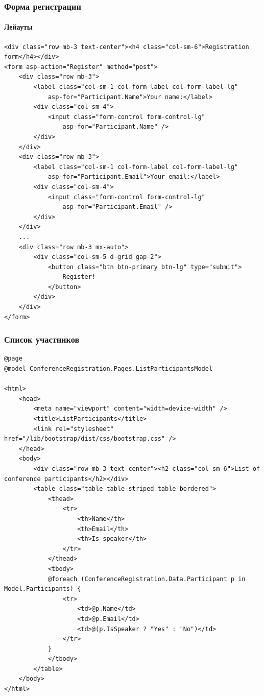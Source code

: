 \documentclass{../../slides-style}
\begin{document}
    \begin{frame}[fragile]
        \frametitle{Форма регистрации}
        \framesubtitle{Лейауты}
        \begin{ssmall}
            \begin{verbatim}
<div class="row mb-3 text-center"><h4 class="col-sm-6">Registration form</h4></div>
<form asp-action="Register" method="post">
    <div class="row mb-3">
        <label class="col-sm-1 col-form-label col-form-label-lg" 
            asp-for="Participant.Name">Your name:</label>
        <div class="col-sm-4">
            <input class="form-control form-control-lg" 
                asp-for="Participant.Name" />
        </div>
    </div>
    <div class="row mb-3">
        <label class="col-sm-1 col-form-label col-form-label-lg" 
            asp-for="Participant.Email">Your email:</label>
        <div class="col-sm-4">
            <input class="form-control form-control-lg" 
                asp-for="Participant.Email" />
        </div>
    </div>
    ...
    <div class="row mb-3 mx-auto">
        <div class="col-sm-5 d-grid gap-2">
            <button class="btn btn-primary btn-lg" type="submit">
                Register!
            </button>
        </div>
    </div>
</form>
            \end{verbatim}
        \end{ssmall}
    \end{frame}

    \begin{frame}[fragile]
        \frametitle{Список участников}
        \begin{ssmall}
            \begin{verbatim}
@page
@model ConferenceRegistration.Pages.ListParticipantsModel

<html>
    <head>
        <meta name="viewport" content="width=device-width" />
        <title>ListParticipants</title>
        <link rel="stylesheet" href="/lib/bootstrap/dist/css/bootstrap.css" />
    </head>
    <body>
        <div class="row mb-3 text-center"><h2 class="col-sm-6">List of conference participants</h2></div>
        <table class="table table-striped table-bordered">
            <thead>
                <tr>
                    <th>Name</th>
                    <th>Email</th>
                    <th>Is speaker</th>
                </tr>
            </thead>
            <tbody>
            @foreach (ConferenceRegistration.Data.Participant p in Model.Participants) {
                <tr>
                    <td>@p.Name</td>
                    <td>@p.Email</td>
                    <td>@(p.IsSpeaker ? "Yes" : "No")</td>
                </tr>
            }
            </tbody>
        </table>
    </body>
</html>
            \end{verbatim}
        \end{ssmall}
    \end{frame}
\end{document}
